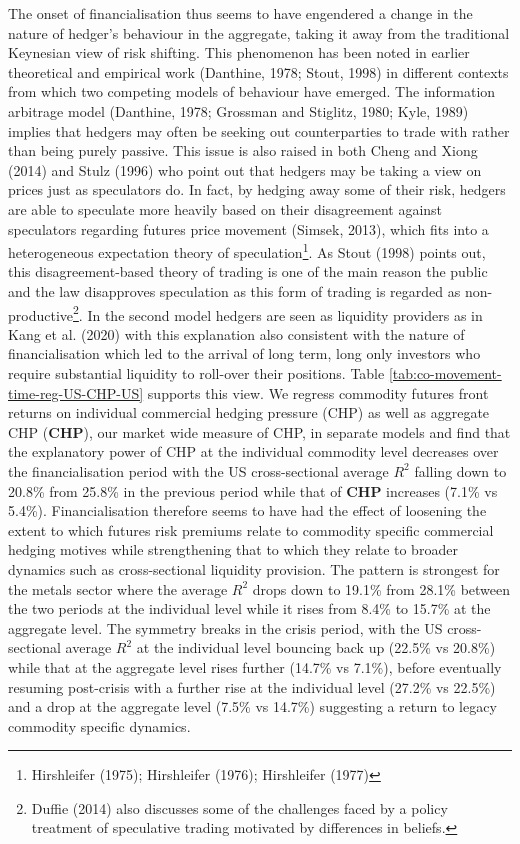 \documentclass[]{elsarticle} %
\begin{document}
The onset of financialisation thus seems to have engendered a change in the nature of hedger's behaviour in the aggregate, taking it away from the traditional Keynesian view of risk shifting. This phenomenon has been noted in earlier theoretical and empirical work (Danthine, 1978; Stout, 1998) in different contexts from which two competing models of behaviour have emerged. The information arbitrage model (Danthine, 1978; Grossman and Stiglitz, 1980; Kyle, 1989) implies that hedgers may often be seeking out counterparties to trade with rather than being purely passive. This issue is also raised in both Cheng and Xiong (2014) and Stulz (1996) who point out that hedgers may be taking a view on prices just as speculators do. In fact, by hedging away some of their risk, hedgers are able to speculate more heavily based on their disagreement against speculators regarding futures price movement (Simsek, 2013), which fits into a heterogeneous expectation theory of speculation\footnote{Hirshleifer (1975); Hirshleifer (1976); Hirshleifer (1977)}. As Stout (1998) points out, this disagreement-based theory of trading is one of the main reason the public and the law disapproves speculation as this form of trading is regarded as non-productive\footnote{Duffie (2014) also discusses some of the challenges faced by a policy treatment of speculative trading motivated by differences in beliefs.}. In the second model hedgers are seen as liquidity providers as in Kang et al. (2020) with this explanation also consistent with the nature of financialisation which led to the arrival of long term, long only investors who require substantial liquidity to roll-over their positions. Table \ref{tab:co-movement-time-reg-US-CHP-US} supports this view. We regress commodity futures front returns on individual commercial hedging pressure (CHP) as well as aggregate CHP (\textbf{CHP}), our market wide measure of CHP, in separate models and find that the explanatory power of CHP at the individual commodity level decreases over the financialisation period with the US cross-sectional average \(R^{2}\) falling down to 20.8\% from 25.8\% in the previous period while that of \textbf{CHP} increases (7.1\% vs 5.4\%). Financialisation therefore seems to have had the effect of loosening the extent to which futures risk premiums relate to commodity specific commercial hedging motives while strengthening that to which they relate to broader dynamics such as cross-sectional liquidity provision. The pattern is strongest for the metals sector where the average \(R^{2}\) drops down to 19.1\% from 28.1\% between the two periods at the individual level while it rises from 8.4\% to 15.7\% at the aggregate level. The symmetry breaks in the crisis period, with the US cross-sectional average \(R^{2}\) at the individual level bouncing back up (22.5\% vs 20.8\%) while that at the aggregate level rises further (14.7\% vs 7.1\%), before eventually resuming post-crisis with a further rise at the individual level (27.2\% vs 22.5\%) and a drop at the aggregate level (7.5\% vs 14.7\%) suggesting a return to legacy commodity specific dynamics.
\end{document}
